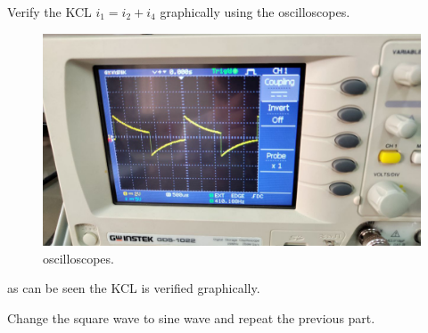 \documentclass[11pt]{article}
\begin{document}
\begin{question}
\begin{subquestion}{Verify the KCL $i_1=i_2+i_4$ graphically using the oscilloscopes.}
{\begin{figure}[H]
                \includegraphics[scale=0.1,angle=0]{Fig/17.jpeg}
                \caption{oscilloscopes.}
            \end{figure}

            as can be seen the KCL is verified graphically.
        }
    \end{subquestion}

    \begin{subquestion}{Change the square wave to sine wave and repeat the previous part.}
    \end{subquestion}


\end{question}
\end{document}
